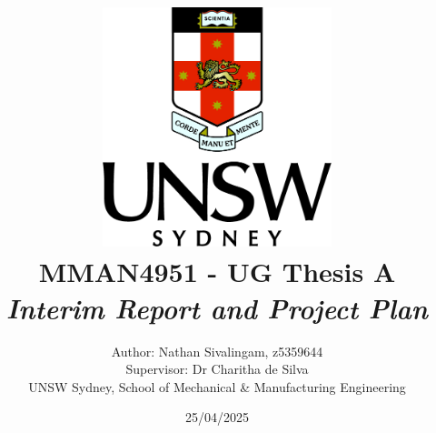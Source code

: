 \title{
    \includegraphics[width=0.5\textwidth]{Figures/unsw_crest.jpg}\\ \vspace{10mm}
    \textbf{MMAN4951 - UG Thesis A\\ 
    \textit{Interim Report and Project Plan\vspace{6mm}}}
    } 
\author{Author: Nathan Sivalingam, z5359644 \vspace{2mm} \\ Supervisor: Dr Charitha de Silva\vspace{4mm} \\ UNSW Sydney, School of Mechanical \& Manufacturing Engineering}
\date{25/04/2025} %

\maketitle

\pagebreak


